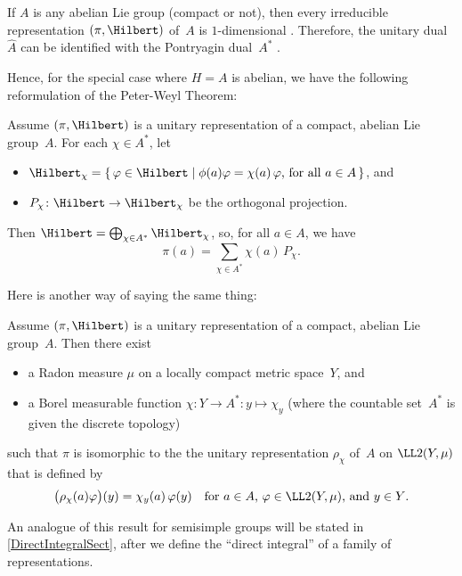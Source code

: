\begin{obs}
If $A$ is any abelian Lie group\/ \textup(compact or not\/\textup), then every irreducible representation $(\pi, \Hilbert)$ of~$A$ is $1$-dimensional . Therefore, the unitary dual~$\widehat A$ can be identified with the Pontryagin dual~$A^*$ .
\end{obs}

Hence, for the special case where $H = A$ is abelian, we have the following reformulation of the Peter-Weyl Theorem:

\begin{cor} \label{PeterWeylAbel}
Assume $(\pi,\Hilbert)$ is a unitary representation of a compact, abelian Lie group~$A$.  For each $\chi \in A^*$, let
	\begin{itemize}
	\item $ \Hilbert_\chi = \{\, \varphi \in \Hilbert \mid 
		\text{$\phi(a) \varphi = \chi(a) \, \varphi$, for all $a \in A$} \,\} $,
	and
	\item $P_\chi \colon \Hilbert \to \Hilbert_\chi$ be the orthogonal projection.
	\end{itemize}
Then $\Hilbert = \bigoplus_{\chi \in A^*} \Hilbert_\chi$, so, for all $a \in A$, we have
	$$ \pi(a) = \sum_{\chi \in A^*} \chi(a) \, P_\chi. $$
\end{cor}

Here is another way of saying the same thing:

\begin{cor} \label{PeterWeylAbelL2}
Assume $(\pi,\Hilbert)$ is a unitary representation of a compact, abelian Lie group~$A$.  Then there exist
	\begin{itemize}
	\item a Radon measure $\mu$ on a locally compact metric space~$Y$,
	and
	\item a Borel measurable function $\chi \colon Y \to A^* \colon y \mapsto \chi_y$ \textup(where the countable set~$A^*$ is given the discrete topology\/\textup)
	\end{itemize}
such that $\pi$ is isomorphic to the the unitary representation $\rho_\chi$ of~$A$ on $\LL2(Y, \mu)$ that is defined by
	$$ \bigl( \rho_\chi(a) \varphi  \bigr)(y) = \chi_y(a) \, \varphi(y)
	 \quad \text{for $a \in A$, $\varphi \in \LL2(Y, \mu )$, and $y \in Y$} .$$
\end{cor}

An analogue of this result for semisimple groups will be stated in \cref{DirectIntegralSect}, after we define the ``direct integral'' of a family of representations.

